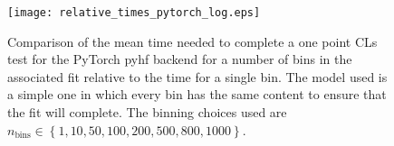 \begin{figure}
 \centering
 \texttt{[image: relative\_times\_pytorch\_log.eps]}
 \caption{Comparison of the mean time needed to complete a one point CLs test for the PyTorch pyhf backend for a number of bins in the associated fit relative to the time for a single bin.
  The model used is a simple one in which every bin has the same content to ensure that the fit will complete.
  The binning choices used are $n_{\text{bins}} \in \left\{1, 10, 50, 100, 200, 500, 800, 1000\right\}$.
 }
 \label{fig:relative_time_pytorch}
\end{figure}
